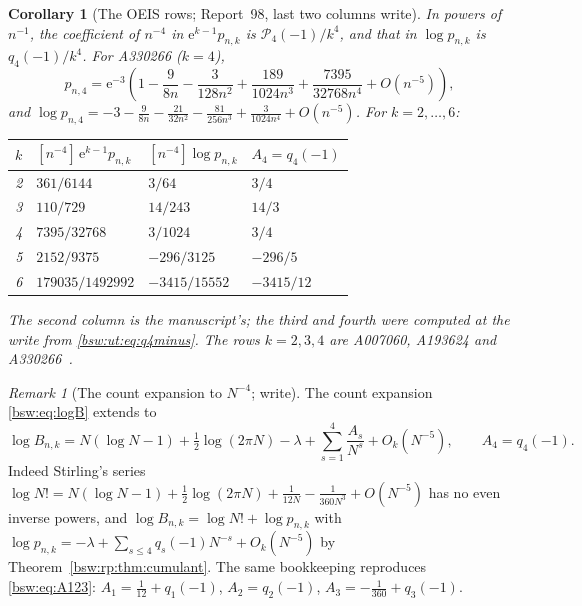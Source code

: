 \documentclass[11pt,letterpaper]{article}
\newtheorem{corollary}[theorem]{Corollary}
\theoremstyle{definition}
\theoremstyle{remark}
\newtheorem{remark}[theorem]{Remark}
\newcommand{\ee}{\mathrm e}
\begin{document}
\begin{corollary}[The OEIS rows; Report~98, last two columns
write]\label{bsw:ut:cor:rows}
In powers of $n^{-1}$, the coefficient of $n^{-4}$ in $\ee^{k-1}p_{n,k}$ is
$\mathcal P_4(-1)/k^4$, and that in $\log p_{n,k}$ is $q_4(-1)/k^4$.  For
A330266 ($k=4$),
\begin{equation}\label{bsw:ut:eq:k4}
 p_{n,4}=\ee^{-3}\left(1-\frac9{8n}-\frac3{128n^2}
 +\frac{189}{1024n^3}+\frac{7395}{32768n^4}+O(n^{-5})\right),
\end{equation}
and $\log p_{n,4}=-3-\frac9{8n}-\frac{21}{32n^2}-\frac{81}{256n^3}
+\frac3{1024n^4}+O(n^{-5})$.  For $k=2,\ldots,6$:
\begin{center}\upshape
\begin{tabular}{rlll}
\toprule
$k$ & $[n^{-4}]\,\ee^{k-1}p_{n,k}$ & $[n^{-4}]\log p_{n,k}$ &
 $A_4=q_4(-1)$\\
\midrule
2 & $361/6144$ & $3/64$ & $3/4$\\
3 & $110/729$ & $14/243$ & $14/3$\\
4 & $7395/32768$ & $3/1024$ & $3/4$\\
5 & $2152/9375$ & $-296/3125$ & $-296/5$\\
6 & $179035/1492992$ & $-3415/15552$ & $-3415/12$\\
\bottomrule
\end{tabular}
\end{center}
The second column is the manuscript's; the third and fourth were computed
at the write from \eqref{bsw:ut:eq:q4minus}.  The rows $k=2,3,4$ are
A007060, A193624 and A330266~\cite{oeis007060,oeis193624,oeis330266}.
\end{corollary}

\begin{remark}[The count expansion to $N^{-4}$; write]\label{bsw:ut:rem:A4}
The count expansion \eqref{bsw:eq:logB} extends to
\begin{equation}\label{bsw:ut:eq:A4}
 \log B_{n,k}=N(\log N-1)+\tfrac12\log(2\pi N)-\lambda
 +\sum_{s=1}^4\frac{A_s}{N^s}+O_k(N^{-5}),
 \qquad A_4=q_4(-1).
\end{equation}
Indeed Stirling's series
$\log N!=N(\log N-1)+\frac12\log(2\pi N)+\frac1{12N}-\frac1{360N^3}
+O(N^{-5})$ has no even inverse powers, and $\log B_{n,k}=\log N!+\log
p_{n,k}$ with $\log p_{n,k}=-\lambda+\sum_{s\le4}q_s(-1)N^{-s}+O_k(N^{-5})$
by Theorem~\ref{bsw:rp:thm:cumulant}.  The same bookkeeping reproduces
\eqref{bsw:eq:A123}: $A_1=\frac1{12}+q_1(-1)$, $A_2=q_2(-1)$,
$A_3=-\frac1{360}+q_3(-1)$.
\end{remark}
\end{document}
